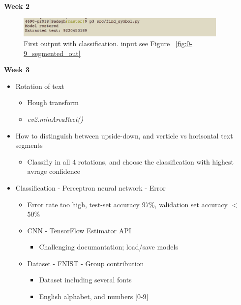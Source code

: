 \documentclass[11pt,a4paper,english]{article}
\newenvironment{loggentry}[2]%
{\noindent\textbf{#2}\marginnote{#1}\\}{\vspace{0.5cm}}
\begin{document}
\begin{loggentry}{26.04.18}{Week 2}
\begin{itemize}
\begin{itemize}
\begin{itemize}
        \begin{figure}[H]
          \centering
          \includegraphics[height=1cm]{res/classification_first_print.png}
          \caption{First output with classification. input see Figure ~\ref{fig:0-9_segmented_out}}
          \label{fig:classification_first_print}
        \end{figure}

      \end{itemize}
    \end{itemize}
\end{itemize}
\end{loggentry}


\newpage
\begin{loggentry}{03.05.18}{Week 3}
\begin{itemize}
  \item{Rotation of text}
  \begin{itemize}
    \item{Hough transform}
    \item{\textit{cv2.minAreaRect()}}
  \end{itemize}
  \item{How to distinguish between upside-down, and verticle vs horisontal text segments}
  \begin{itemize}
    \item{Classifiy in all 4 rotations, and choose the classification with highest avrage confidence}
  \end{itemize}
  \item{Classification - Perceptron neural network - Error}
  \begin{itemize}
    \item{Error rate too high, test-set accuracy 97\%, validation set accuracy $<$ 50\%}
    \item{CNN - TensorFlow Estimator API}
    \begin{itemize}
      \item{Challenging documantation; load/save models}
    \end{itemize}
    \item{Dataset - FNIST - Group contribution}
    \begin{itemize}
      \item{Dataset including several fonts}
      \item{English alphabet, and numbers [0-9]}
    \end{itemize}
  \end{itemize}
\end{itemize}
\end{loggentry}
\end{document}
